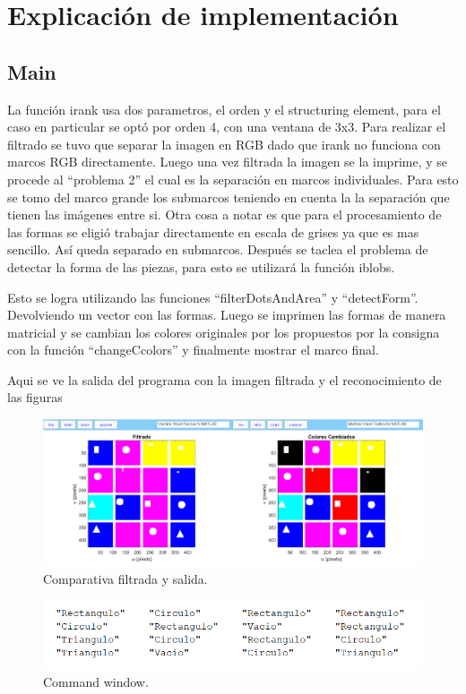 \section{Explicaci\'on de implementaci\'on}
\subsection{Main}
La función irank usa dos parametros, el orden y el structuring element, para el caso en particular se opt\'o por orden 4, con una ventana de 3x3. Para realizar el filtrado se tuvo que separar la imagen en RGB dado que irank no funciona con marcos RGB directamente.
Luego una vez filtrada la imagen se la imprime, y se procede al ``problema 2'' el cual es la separación en marcos individuales. Para esto se tomo del marco grande los submarcos teniendo en cuenta la la separación que tienen las imágenes entre si. Otra cosa a notar es que para el procesamiento de las formas se eligi\'o trabajar directamente en escala de grises ya que es mas sencillo.
As\'i queda separado en submarcos.
Despu\'es se taclea el problema de detectar la forma de las piezas, para esto se utilizar\'a la funci\'on iblobs.


Esto se logra utilizando las funciones ``filterDotsAndArea'' y ``detectForm''. Devolviendo un vector con las formas.
Luego se imprimen las formas de manera matricial y se cambian los colores originales por los propuestos por la consigna con la funci\'on ``changeCcolors'' y finalmente mostrar el marco final.



Aqui se ve la salida del programa con la imagen filtrada y el reconocimiento de las figuras
\begin{figure}[H]
	\centering
	\includegraphics[width=0.8\linewidth]{Imagenes/Final.png}
	\caption{Comparativa filtrada y salida.}	
	\label{fig:fs}
\end{figure}

\begin{figure}[H]
	\centering
	\includegraphics[width=0.8\linewidth]{Imagenes/comandwindow.png}
	\caption{Command window.}	
	\label{fig:cw}
\end{figure}
